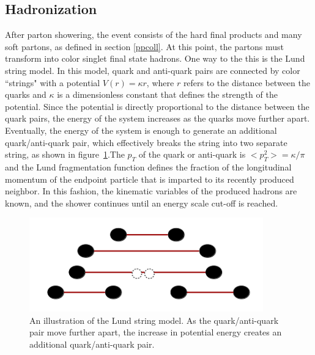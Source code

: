 \documentclass[oneside, letterpaper, oldfontcommands]{memoir}
\begin{document}
\subsection{Hadronization}\label{hadronization}
 
\qquad After parton showering, the event consists of the hard final products and many soft partons, as defined in section \ref{ppcoll}. At this point, the partons must transform into color singlet final state hadrons. One way to the this is the Lund string model\cite{Barger:0201058766}. In this model, quark and anti-quark pairs are connected by color ``strings" with a potential 
$V(r) = \kappa r $, where $r$ refers to the distance between the quarks and $\kappa$ is a dimensionless constant that defines the strength of the potential. Since the potential is directly proportional to the distance between the quark pairs, the energy of the system increases as the quarks move further apart. Eventually, the energy of the system is enough to generate an additional quark/anti-quark pair, which effectively breaks the string into two separate string, as shown in figure~\ref{fig:lund}.The $p_{T}$ of the quark or anti-quark is  
$<p^{2}_{T}> = \kappa / \pi$ and the Lund fragmentation function\cite{Agashe:2014kda} defines the fraction of the longitudinal momentum of the endpoint particle that is imparted to its recently produced neighbor. In this fashion, the kinematic variables of the produced hadrons are known, and the shower continues until an energy scale cut-off is reached.

\begin{figure}[here]
\includegraphics[width=0.9\textwidth]{lundstring.png}
\caption{An illustration of the Lund string model. As the quark/anti-quark pair move further apart, the increase in potential energy creates an additional quark/anti-quark pair.}
\label{fig:lund}
\end{figure}


\end{document}
